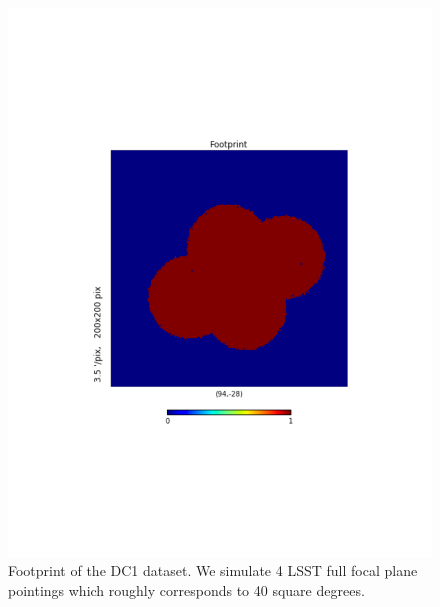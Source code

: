 \documentclass[\docopts]{\docclass}
\begin{document}
\begin{figure}
\centering
\includegraphics[trim={4cm, 4cm, 4cm, 4cm},clip,width=0.9\columnwidth]{footprint.pdf}
\caption{Footprint of the DC1 dataset. We simulate 4 LSST full focal plane pointings which roughly corresponds to 40 square degrees.}
\label{fig:footprint}
\end{figure}

\end{document}
